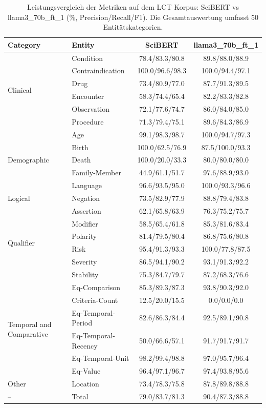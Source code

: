 
\begin{table}[htbp]
\centering
\begin{tabular}{llcc}
\toprule
\textbf{Category} & \textbf{Entity} & \textbf{SciBERT} & \textbf{llama3_70b_ft_1} \\
\midrule
\multirow{6}{*}{Clinical} & Condition & 78.4/83.3/80.8 & 89.8/88.0/88.9 \\
 & Contraindication & 100.0/96.6/98.3 & 100.0/94.4/97.1 \\
 & Drug & 73.4/80.9/77.0 & 87.7/91.3/89.5 \\
 & Encounter & 58.3/74.4/65.4 & 82.2/83.3/82.8 \\
 & Observation & 72.1/77.6/74.7 & 86.0/84.0/85.0 \\
 & Procedure & 71.3/79.4/75.1 & 89.6/84.3/86.9 \\
\midrule
\multirow{5}{*}{Demographic} & Age & 99.1/98.3/98.7 & 100.0/94.7/97.3 \\
 & Birth & 100.0/62.5/76.9 & 87.5/100.0/93.3 \\
 & Death & 100.0/20.0/33.3 & 80.0/80.0/80.0 \\
 & Family-Member & 44.9/61.1/51.7 & 97.6/88.9/93.0 \\
 & Language & 96.6/93.5/95.0 & 100.0/93.3/96.6 \\
\midrule
Logical & Negation & 73.5/82.9/77.9 & 88.8/79.4/83.8 \\
\midrule
\multirow{6}{*}{Qualifier} & Assertion & 62.1/65.8/63.9 & 76.3/75.2/75.7 \\
 & Modifier & 58.5/65.4/61.8 & 85.3/81.6/83.4 \\
 & Polarity & 81.4/79.5/80.4 & 86.8/75.6/80.8 \\
 & Risk & 95.4/91.3/93.3 & 100.0/77.8/87.5 \\
 & Severity & 86.5/94.1/90.2 & 93.1/91.3/92.2 \\
 & Stability & 75.3/84.7/79.7 & 87.2/68.3/76.6 \\
\midrule
\multirow{6}{*}{Temporal and Comparative} & Eq-Comparison & 85.3/89.3/87.3 & 93.8/90.3/92.0 \\
 & Criteria-Count & 12.5/20.0/15.5 & 0.0/0.0/0.0 \\
 & Eq-Temporal-Period & 82.6/86.3/84.4 & 92.5/89.1/90.8 \\
 & Eq-Temporal-Recency & 50.0/66.6/57.1 & 91.7/91.7/91.7 \\
 & Eq-Temporal-Unit & 98.2/99.4/98.8 & 97.0/95.7/96.4 \\
 & Eq-Value & 96.4/97.1/96.7 & 97.4/93.8/95.6 \\
\midrule
Other & Location & 73.4/78.3/75.8 & 87.8/89.8/88.8 \\
\midrule
-- & Total & 79.0/83.7/81.3 & 90.4/87.3/88.8 \\
\bottomrule
\end{tabular}
\caption{Leistungsvergleich der Metriken auf dem LCT Korpus: SciBERT vs llama3_70b_ft_1 (\%, Precision/Recall/F1). Die Gesamtauswertung umfasst 50 Entitätskategorien.}
\label{tab:metrics_comparison}
\end{table}
    